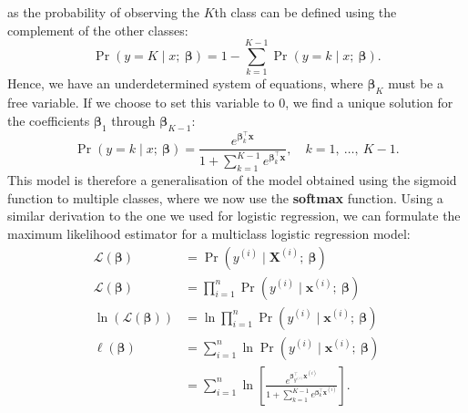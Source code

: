 \documentclass{article}
\begin{document}
as the probability of observing the \(K\)th class can be defined using
the complement of the other classes:
\begin{equation*}
    \Pr{\left( y = K \mid x;\: \symbf{\beta} \right)} = 1 - \sum_{k = 1}^{K - 1} \Pr{\left( y = k \mid x;\: \symbf{\beta} \right)}.
\end{equation*}
Hence, we have an underdetermined system of equations, where
\(\symbf{\beta}_K\) must be a free variable. If we choose to set this
variable to 0, we find a unique solution for the coefficients
\(\symbf{\beta}_1\) through \(\symbf{\beta}_{K-1}\):
\begin{equation*}
    \Pr{\left( y = k \mid x;\: \symbf{\beta} \right)} = \frac{e^{\symbf{\beta}_k^\top \symbf{x}}}{1 + \sum_{k = 1}^{K-1} e^{\symbf{\beta}_k^\top \symbf{x}}}, \quad k = 1,\: \dots,\: K - 1.
\end{equation*}
This model is therefore a generalisation of the model obtained using the
sigmoid function to multiple classes, where we now use the
\textbf{softmax} function. Using a similar derivation to the one we used
for logistic regression, we can formulate the maximum likelihood
estimator for a multiclass logistic regression model:
\begin{align*}
    \mathcal{L}\left( \symbf{\beta} \right)                     & = \Pr{\left( y^{\left( i \right)} \mid \symbf{X}^{\left( i \right)};\: \symbf{\beta} \right)}                                                                                                         \\
    \mathcal{L}\left( \symbf{\beta} \right)                     & = \prod_{i = 1}^n \Pr{\left( y^{\left( i \right)} \mid \symbf{x}^{\left( i \right)};\: \symbf{\beta} \right)}                                                                                         \\
    \ln{\left( \mathcal{L}\left( \symbf{\beta} \right) \right)} & = \ln{\prod_{i = 1}^n \Pr{\left( y^{\left( i \right)} \mid \symbf{x}^{\left( i \right)};\: \symbf{\beta} \right)}}                                                                                    \\
    \ell\left( \symbf{\beta} \right)                            & = \sum_{i = 1}^n \ln{\Pr{\left( y^{\left( i \right)} \mid \symbf{x}^{\left( i \right)};\: \symbf{\beta} \right)}}                                                                                     \\
                                                                & = \sum_{i = 1}^n \ln{\left[ \frac{e^{\symbf{\beta}_{y^{\left( i \right)}}^\top \symbf{x}^{\left( i \right)}}}{1 + \sum_{k = 1}^{K-1} e^{\symbf{\beta}_k^\top \symbf{x}^{\left( i \right)}}} \right]}.
\end{align*}
\end{document}
